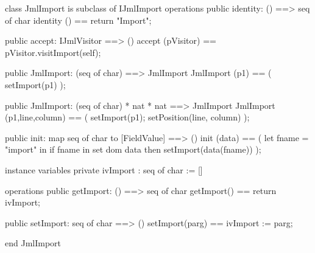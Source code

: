 \begin{vdm_al}
class JmlImport is subclass of IJmlImport
operations
  public identity: () ==> seq of char
  identity () == return "Import";

  public accept: IJmlVisitor ==> ()
  accept (pVisitor) == pVisitor.visitImport(self);

  public JmlImport:
    (seq of char) ==> JmlImport
  JmlImport (p1) == 
    ( setImport(p1) );

  public JmlImport:
    (seq of char) *
    nat *
    nat ==> JmlImport
  JmlImport (p1,line,column) == 
    ( setImport(p1);
      setPosition(line, column) );

  public init: map seq of char to [FieldValue] ==> ()
  init (data) ==
    ( let fname = "import" in
        if fname in set dom data
        then setImport(data(fname)) );

instance variables
  private ivImport : seq of char := []

operations
  public getImport: () ==> seq of char
  getImport() == return ivImport;

  public setImport: seq of char ==> ()
  setImport(parg) == ivImport := parg;

end JmlImport
\end{vdm_al}

